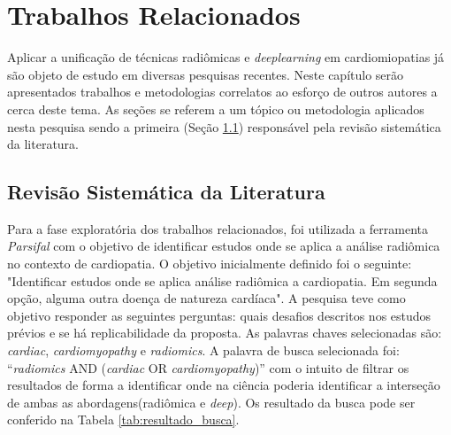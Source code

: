 \chapter{Trabalhos Relacionados} \label{chap:trab_relacionados}


Aplicar a unificação de técnicas radiômicas e \textit{deeplearning} em cardiomiopatias já são objeto de estudo em diversas pesquisas recentes.
Neste capítulo serão apresentados trabalhos e metodologias correlatos ao esforço de outros autores a cerca deste tema. As seções se referem a um tópico ou metodologia aplicados nesta pesquisa sendo a primeira (Seção \ref{sec:rev_sistematica}) responsável pela revisão sistemática da literatura.

\section{Revisão Sistemática da Literatura} \label{sec:rev_sistematica}

Para a fase exploratória dos trabalhos relacionados, foi utilizada a ferramenta \textit{Parsifal} com o objetivo de identificar estudos onde se aplica a análise radiômica no contexto de cardiopatia. O objetivo inicialmente definido foi o seguinte: "Identificar estudos onde se aplica análise radiômica a cardiopatia. Em segunda opção, alguma outra doença de natureza cardíaca". A pesquisa teve como objetivo responder as seguintes perguntas: quais desafios descritos nos estudos prévios e se há replicabilidade da proposta. As palavras chaves selecionadas são: \textit{cardiac}, \textit{cardiomyopathy} e \textit{radiomics}. A palavra de busca selecionada foi: ``\textit{radiomics} AND (\textit{cardiac} OR \textit{cardiomyopathy})'' com o intuito de filtrar os resultados de forma a identificar onde na ciência poderia identificar a interseção de ambas as abordagens(radiômica e \textit{deep}). Os resultado da busca pode ser conferido na Tabela \ref{tab:resultado_busca}. 

